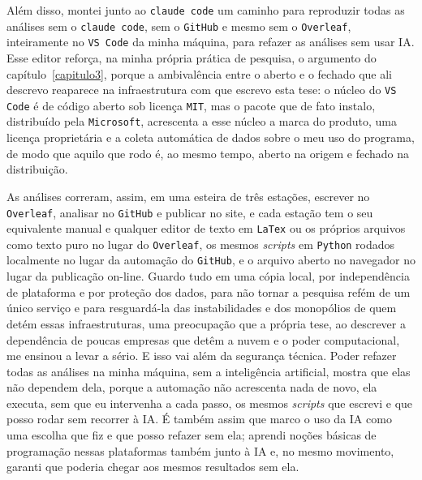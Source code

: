 Além disso, montei junto ao \texttt{claude code} um caminho para reproduzir todas as análises sem o \texttt{claude code}, sem o \texttt{GitHub} e mesmo sem o \texttt{Overleaf}, inteiramente no \texttt{VS Code} da minha máquina, para refazer as análises sem usar IA. Esse editor reforça, na minha própria prática de pesquisa, o argumento do capítulo~\ref{capitulo3}, porque a ambivalência entre o aberto e o fechado que ali descrevo reaparece na infraestrutura com que escrevo esta tese: o núcleo do \texttt{VS Code} é de código aberto sob licença \texttt{MIT}, mas o pacote que de fato instalo, distribuído pela \texttt{Microsoft}, acrescenta a esse núcleo a marca do produto, uma licença proprietária e a coleta automática de dados sobre o meu uso do programa, de modo que aquilo que rodo é, ao mesmo tempo, aberto na origem e fechado na distribuição. 

As análises correram, assim, em uma esteira de três estações, escrever no \texttt{Overleaf}, analisar no \texttt{GitHub} e publicar no site, e cada estação tem o seu equivalente manual e qualquer editor de texto em \texttt{LaTex} ou os próprios arquivos como texto puro no lugar do \texttt{Overleaf}, os mesmos \textit{scripts} em \texttt{Python} rodados localmente no lugar da automação do \texttt{GitHub}, e o arquivo aberto no navegador no lugar da publicação on-line. Guardo tudo em uma cópia local, por independência de plataforma e por proteção dos dados, para não tornar a pesquisa refém de um único serviço e para resguardá-la das instabilidades e dos monopólios de quem detém essas infraestruturas, uma preocupação que a própria tese, ao descrever a dependência de poucas empresas que detêm a nuvem e o poder computacional, me ensinou a levar a sério. E isso vai além da segurança técnica. Poder refazer todas as análises na minha máquina, sem a inteligência artificial, mostra que elas não dependem dela, porque a automação não acrescenta nada de novo, ela executa, sem que eu intervenha a cada passo, os mesmos \textit{scripts} que escrevi e que posso rodar sem recorrer à IA. É também assim que marco o uso da IA como uma escolha que fiz e que posso refazer sem ela; aprendi noções básicas de programação nessas plataformas também junto à IA e, no mesmo movimento, garanti que poderia chegar aos mesmos resultados sem ela. 


